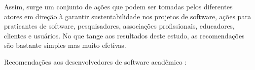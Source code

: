 Assim, surge um conjunto de ações que podem ser tomadas pelos diferentes atores
em direção à garantir sustentabilidade nos projetos de software, ações para
praticantes de software, pesquisadores, associações profissionais, educadores,
clientes e usuários. No que tange aos resultados deste estudo, as recomendações
são bastante simples mas muito efetivas.


Recomendações aos desenvolvedores de software acadêmico \cite{jimenez_four_2017}:


